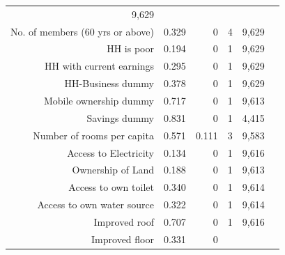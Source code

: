 \documentclass[12pt]{article}
\begin{document}
{\begin{table}[!h]
\begin{tabular}{llllll}
  \multicolumn{1}{|r|}{9,629}  \\
\multicolumn{1}{|r}{No. of members (60 yrs or above)} &
  \multicolumn{1}{|r}{0.329} &
  \multicolumn{1}{|r}{0} &
  \multicolumn{1}{|r}{4} &
  \multicolumn{1}{|r|}{9,629}  \\
\multicolumn{1}{|r}{HH is poor} &
  \multicolumn{1}{|r}{0.194} &
  \multicolumn{1}{|r}{0} &
  \multicolumn{1}{|r}{1} &
  \multicolumn{1}{|r|}{9,629}  \\
\multicolumn{1}{|r}{HH with current earnings} &
  \multicolumn{1}{|r}{0.295} &
  \multicolumn{1}{|r}{0} &
  \multicolumn{1}{|r}{1} &
  \multicolumn{1}{|r|}{9,629}  \\
\multicolumn{1}{|r}{HH-Business dummy} &
  \multicolumn{1}{|r}{0.378} &
  \multicolumn{1}{|r}{0} &
  \multicolumn{1}{|r}{1} &
  \multicolumn{1}{|r|}{9,629} \\
\multicolumn{1}{|r}{Mobile ownership dummy} &
  \multicolumn{1}{|r}{0.717} &
  \multicolumn{1}{|r}{0} &
  \multicolumn{1}{|r}{1} &
  \multicolumn{1}{|r|}{9,613}  \\
\multicolumn{1}{|r}{Savings dummy} &
  \multicolumn{1}{|r}{0.831} &
  \multicolumn{1}{|r}{0} &
  \multicolumn{1}{|r}{1} &
  \multicolumn{1}{|r|}{4,415}  \\
\multicolumn{1}{|r}{Number of rooms per capita} &
  \multicolumn{1}{|r}{0.571} &
  \multicolumn{1}{|r}{0.111} &
  \multicolumn{1}{|r}{3} &
  \multicolumn{1}{|r|}{9,583} \\
\multicolumn{1}{|r}{Access to Electricity} &
  \multicolumn{1}{|r}{0.134} &
  \multicolumn{1}{|r}{0} &
  \multicolumn{1}{|r}{1} &
  \multicolumn{1}{|r|}{9,616}  \\
\multicolumn{1}{|r}{Ownership of Land} &
  \multicolumn{1}{|r}{0.188} &
  \multicolumn{1}{|r}{0} &
  \multicolumn{1}{|r}{1} &
  \multicolumn{1}{|r|}{9,613} \\
\multicolumn{1}{|r}{Access to own toilet} &
  \multicolumn{1}{|r}{0.340} &
  \multicolumn{1}{|r}{0} &
  \multicolumn{1}{|r}{1} &
  \multicolumn{1}{|r|}{9,614} \\
\multicolumn{1}{|r}{Access to own water source} &
  \multicolumn{1}{|r}{0.322} &
  \multicolumn{1}{|r}{0} &
  \multicolumn{1}{|r}{1} &
  \multicolumn{1}{|r|}{9,614} \\
\multicolumn{1}{|r}{Improved roof} &
  \multicolumn{1}{|r}{0.707} &
  \multicolumn{1}{|r}{0} &
  \multicolumn{1}{|r}{1} &
  \multicolumn{1}{|r|}{9,616} \\
\multicolumn{1}{|r}{Improved floor} &
  \multicolumn{1}{|r}{0.331} &
  \multicolumn{1}{|r}{0} &

\end{tabular}
\end{table}}
\end{document}
